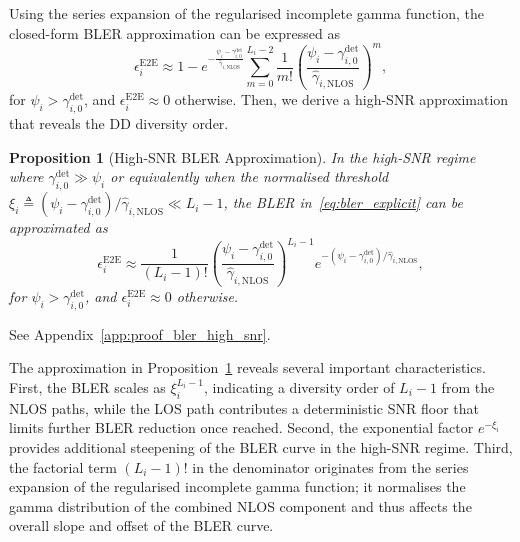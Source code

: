 \documentclass[lettersize,journal]{IEEEtran}
\newtheorem{proposition}{Proposition}
\begin{document}
Using the series expansion of the regularised incomplete gamma function, the closed-form BLER approximation can be expressed as
\begin{equation}
\epsilon_i^{\mathrm{E2E}} \approx 1 - e^{-\frac{\psi_i - \gamma_{i,0}^{\mathrm{det}}}{\hat{\gamma}_{i,\mathrm{NLOS}}}} \sum_{m=0}^{L_i-2} \frac{1}{m!}\left(\frac{\psi_i - \gamma_{i,0}^{\mathrm{det}}}{\hat{\gamma}_{i,\mathrm{NLOS}}}\right)^m,
\label{eq:bler_explicit}
\end{equation}
for $\psi_i > \gamma_{i,0}^{\mathrm{det}}$, and $\epsilon_i^{\mathrm{E2E}} \approx 0$ otherwise. Then, we derive a high-SNR approximation that reveals the DD diversity order.
\begin{proposition}[High-SNR BLER Approximation]
\label{prop:bler_high_snr}
In the high-SNR regime where $\gamma_{i,0}^{\mathrm{det}} \gg \psi_i$ or equivalently when the normalised threshold $\xi_i \triangleq (\psi_i - \gamma_{i,0}^{\mathrm{det}})/\hat{\gamma}_{i,\mathrm{NLOS}} \ll L_i - 1$, the BLER in~\eqref{eq:bler_explicit} can be approximated as
\begin{equation}
\epsilon_i^{\mathrm{E2E}} \approx \frac{1}{(L_i-1)!} \left(\frac{\psi_i - \gamma_{i,0}^{\mathrm{det}}}{\hat{\gamma}_{i,\mathrm{NLOS}}}\right)^{L_i-1} e^{-(\psi_i - \gamma_{i,0}^{\mathrm{det}})/\hat{\gamma}_{i,\mathrm{NLOS}}},
\label{eq:bler_high_snr}
\end{equation}
for $\psi_i > \gamma_{i,0}^{\mathrm{det}}$, and $\epsilon_i^{\mathrm{E2E}} \approx 0$ otherwise.
\end{proposition}

\begin{IEEEproof}
See Appendix~\ref{app:proof_bler_high_snr}.
\end{IEEEproof}
The approximation in Proposition~\ref{prop:bler_high_snr} reveals several important characteristics. First, the BLER scales as $\xi_i^{L_i-1}$, indicating a diversity order of $L_i-1$ from the NLOS paths, while the LOS path contributes a deterministic SNR floor that limits further BLER reduction once reached. Second, the exponential factor $e^{-\xi_i}$ provides additional steepening of the BLER curve in the high-SNR regime. Third, the factorial term $(L_i-1)!$ in the denominator originates from the series expansion of the regularised incomplete gamma function; it normalises the gamma distribution of the combined NLOS component and thus affects the overall slope and offset of the BLER curve.
\end{document}
